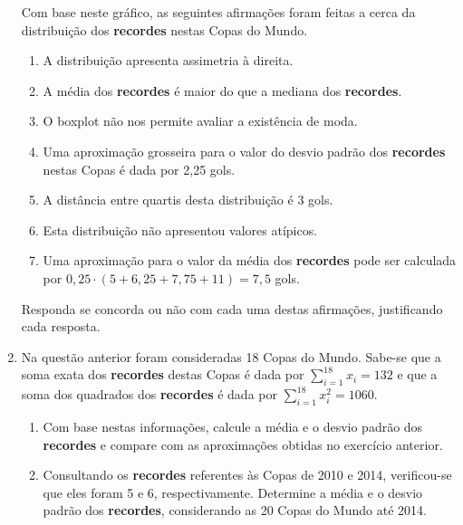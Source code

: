 \begin{enumerate}
Com base neste gráfico, as seguintes afirmações foram feitas a cerca da distribuição dos \textbf{recordes}  nestas Copas do Mundo.
\begin{enumerate}
\item {} 
A distribuição apresenta assimetria à direita.

\item {} 
A média dos \textbf{recordes} é maior do que a mediana dos \textbf{recordes}.

\item {} 
O boxplot não nos permite avaliar a existência de moda.

\item {} 
Uma aproximação grosseira para o valor do desvio padrão dos \textbf{recordes} nestas Copas é dada por 2,25 gols.

\item {} 
A distância entre quartis desta distribuição é 3 gols.

\item {} 
Esta distribuição não apresentou valores atípicos.

\item {} 
Uma aproximação para o valor da média dos \textbf{recordes} pode ser calculada por \(0,25\cdot (5+6,25+7,75+11)=7,5\) gols.

\end{enumerate}

Responda se concorda ou não com cada uma destas afirmações, justificando cada resposta.

\item Na questão anterior foram consideradas 18 Copas do Mundo. Sabe-se que a soma exata dos \textbf{recordes} destas Copas é dada por \(\displaystyle{\sum^{18}_{i=1}}x_i=132\) e que a soma dos quadrados dos \textbf{recordes} é dada por \(\displaystyle{\sum^{18}_{i=1}}x^2_i=1060\).
\begin{enumerate}
\item {} 
Com base nestas informações, calcule a média e o desvio padrão dos \textbf{recordes} e compare com as aproximações obtidas no exercício anterior.

\item {} 
Consultando os \textbf{recordes} referentes às Copas de 2010 e 2014, verificou-se que eles foram 5 e 6, respectivamente. Determine a média e o desvio padrão dos \textbf{recordes}, considerando as 20 Copas do Mundo até 2014.

\end{enumerate}


\end{enumerate}
